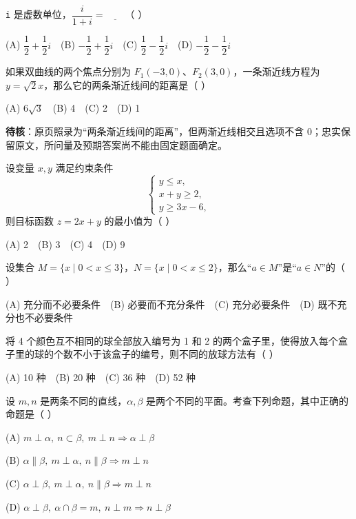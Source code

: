 \begin{question}

\texttt{i} 是虚数单位，\(\dfrac{i}{1+i}=\underline{\qquad}\)（  ）

(A) \(\dfrac12+\dfrac12i\)　(B) \(-\dfrac12+\dfrac12i\)　(C) \(\dfrac12-\dfrac12i\)　(D) \(-\dfrac12-\dfrac12i\)

\end{question}
\begin{question}

如果双曲线的两个焦点分别为 \(F_1(-3,0)\)、\(F_2(3,0)\)，一条渐近线方程为 \(y=\sqrt2x\)，那么它的两条渐近线间的距离是（  ）

(A) \(6\sqrt3\)　(B) 4　(C) 2　(D) 1

\begin{gktip}
\textbf{待核}：原页照录为“两条渐近线间的距离”，但两渐近线相交且选项不含 0；忠实保留原文，所问量及预期答案尚不能由固定题面确定。
\end{gktip}

\end{question}
\begin{question}

设变量 \(x,y\) 满足约束条件
\nopagebreak[4]
\[
\begin{cases}
y\leq x,\\
x+y\geq 2,\\
y\geq 3x-6,
\end{cases}
\]
则目标函数 \(z=2x+y\) 的最小值为（  ）

(A) 2　(B) 3　(C) 4　(D) 9

\end{question}
\begin{question}

设集合 \(M=\{x\mid 0<x\leq 3\}\)，\(N=\{x\mid 0<x\leq 2\}\)，那么“\(a\in M\)”是“\(a\in N\)”的（  ）

(A) 充分而不必要条件　(B) 必要而不充分条件　(C) 充分必要条件　(D) 既不充分也不必要条件

\end{question}
\begin{question}

将 4 个颜色互不相同的球全部放入编号为 1 和 2 的两个盒子里，使得放入每个盒子里的球的个数不小于该盒子的编号，则不同的放球方法有（  ）

(A) 10 种　(B) 20 种　(C) 36 种　(D) 52 种

\end{question}
\begin{question}

设 \(m,n\) 是两条不同的直线，\(\alpha,\beta\) 是两个不同的平面。考查下列命题，其中正确的命题是（  ）

(A) \(m\perp\alpha,\ n\subset\beta,\ m\perp n\Rightarrow\alpha\perp\beta\)

(B) \(\alpha\parallel\beta,\ m\perp\alpha,\ n\parallel\beta\Rightarrow m\perp n\)

(C) \(\alpha\perp\beta,\ m\perp\alpha,\ n\parallel\beta\Rightarrow m\perp n\)

(D) \(\alpha\perp\beta,\ \alpha\cap\beta=m,\ n\perp m\Rightarrow n\perp\beta\)

\end{question}
